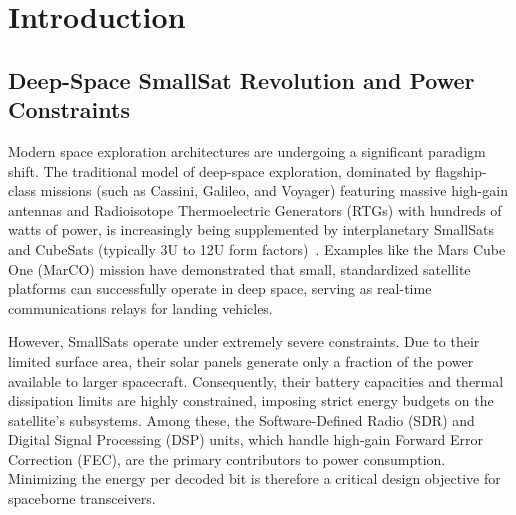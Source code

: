 \documentclass[journal,twocolumn]{IEEEtran}
\begin{document}
\section{Introduction}
\label{sec:intro}

\subsection{Deep-Space SmallSat Revolution and Power Constraints}
Modern space exploration architectures are undergoing a significant paradigm shift. The traditional model of deep-space exploration, dominated by flagship-class missions (such as Cassini, Galileo, and Voyager) featuring massive high-gain antennas and Radioisotope Thermoelectric Generators (RTGs) with hundreds of watts of power, is increasingly being supplemented by interplanetary SmallSats and CubeSats (typically 3U to 12U form factors)~\cite{nasa2022smallsat}. Examples like the Mars Cube One (MarCO) mission have demonstrated that small, standardized satellite platforms can successfully operate in deep space, serving as real-time communications relays for landing vehicles.

However, SmallSats operate under extremely severe constraints. Due to their limited surface area, their solar panels generate only a fraction of the power available to larger spacecraft. Consequently, their battery capacities and thermal dissipation limits are highly constrained, imposing strict energy budgets on the satellite's subsystems. Among these, the Software-Defined Radio (SDR) and Digital Signal Processing (DSP) units, which handle high-gain Forward Error Correction (FEC), are the primary contributors to power consumption. Minimizing the energy per decoded bit is therefore a critical design objective for spaceborne transceivers.
\end{document}
